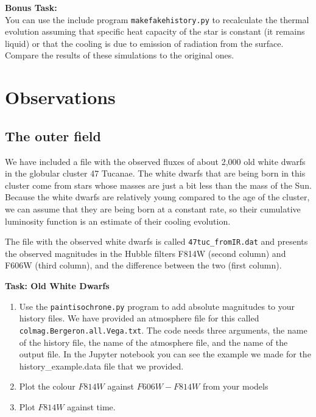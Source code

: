 \documentclass{article}
\begin{document}

\textbf{Bonus Task:}\\
You can use the include program \texttt{makefakehistory.py} to recalculate the thermal evolution assuming that specific heat capacity of the star is constant (it remains liquid) or that the cooling is due to emission of radiation from the surface.  Compare the results of these simulations to the original ones.

\section{Observations}

\subsection{The outer field}
We have included a file with the observed fluxes of about 2,000 old white dwarfs in the globular cluster 47 Tucanae.  The white dwarfs that are being born in this cluster come from stars whose masses are just a bit less than the mass of the Sun.   Because the white dwarfs are relatively young compared to the age of the cluster, we can assume that they are being born at a constant rate, so their cumulative luminosity function is an estimate of their cooling evolution.

The file with the observed white dwarfs is called \texttt{47tuc\_fromIR.dat} and presents the observed magnitudes in the Hubble filters F814W (second column) and F606W (third column), and the difference between the two (first column).

\textbf{Task: Old White Dwarfs}\vspace{-1em}
\begin{enumerate}
 \setlength\itemsep{0em}
\item Use the \texttt{paintisochrone.py} program to add absolute magnitudes to your history files.  We have provided an atmosphere file for this called \texttt{colmag.Bergeron.all.Vega.txt}. The code needs three arguments, the name of the history file, the name of the atmosphere file, and the name of the output file. In the Jupyter notebook you can see the example we made for the history\_example.data file that we provided.
\item Plot the colour $F814W$ against $F606W-F814W$ from your models
\item Plot $F814W$ against time.
\end{enumerate}
\end{document}
